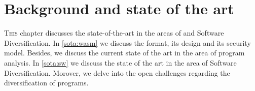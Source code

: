\chapter{Background and state of the art}
\label{SOTA}

\lettrine[lines=4]{T}{his} chapter discusses the state-of-the-art in the areas of \Wasm and Software Diversification. 
In \autoref{sota:wasm} we discuss the \Wasm format, its design and its security model.
Besides, we discuss the current state of the art in the area of \Wasm program analysis.
In \autoref{sota:sw} we discuss the state of the art in the area of Software Diversification.
Morover, we delve into the open challenges regarding the diversification of \Wasm programs.






